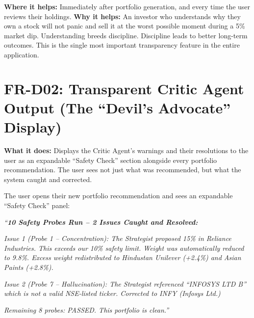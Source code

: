 \documentclass[12pt, a4paper, openany, oneside]{report}
\begin{document}
\begin{valuebox}
\textbf{Where it helps:} Immediately after portfolio generation, and every time the user reviews their holdings. \textbf{Why it helps:} An investor who understands why they own a stock will not panic and sell it at the worst possible moment during a 5\% market dip. Understanding breeds discipline. Discipline leads to better long-term outcomes. This is the single most important transparency feature in the entire application.
\end{valuebox}

\section{FR-D02: Transparent Critic Agent Output (The ``Devil's Advocate'' Display)}

\textbf{What it does:} Displays the Critic Agent's warnings and their resolutions to the user as an expandable ``Safety Check'' section alongside every portfolio recommendation. The user sees not just what was recommended, but what the system caught and corrected.

\begin{examplebox}
The user opens their new portfolio recommendation and sees an expandable ``Safety Check'' panel:

\textit{``\textbf{10 Safety Probes Run -- 2 Issues Caught and Resolved:}}

\textit{Issue 1 (Probe 1 -- Concentration): The Strategist proposed 15\% in Reliance Industries. This exceeds our 10\% safety limit. Weight was automatically reduced to 9.8\%. Excess weight redistributed to Hindustan Unilever (+2.4\%) and Asian Paints (+2.8\%).}

\textit{Issue 2 (Probe 7 -- Hallucination): The Strategist referenced ``INFOSYS LTD B'' which is not a valid NSE-listed ticker. Corrected to INFY (Infosys Ltd.)}

\textit{Remaining 8 probes: PASSED. This portfolio is clean.''}
\end{examplebox}
\end{document}
